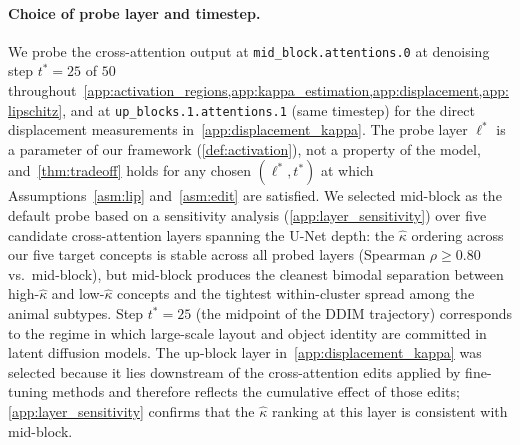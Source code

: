 \paragraph{Choice of probe layer and timestep.}
We probe the cross-attention output at \texttt{mid\_block.attentions.0} at denoising step $t^*=25$ of $50$ throughout~\cref{app:activation_regions,app:kappa_estimation,app:displacement,app:lipschitz}, and at \texttt{up\_blocks.1.attentions.1} (same timestep) for the direct displacement measurements in~\cref{app:displacement_kappa}. The probe layer $\ell^*$ is a parameter of our framework (\cref{def:activation}), not a property of the model, and~\cref{thm:tradeoff} holds for any chosen $(\ell^*, t^*)$ at which Assumptions~\ref{asm:lip} and~\ref{asm:edit} are satisfied. We selected mid-block as the default probe based on a sensitivity analysis (\cref{app:layer_sensitivity}) over five candidate cross-attention layers spanning the U-Net depth: the $\hat\kappa$ ordering across our five target concepts is stable across all probed layers (Spearman $\rho \geq 0.80$ vs.\ mid-block), but mid-block produces the cleanest bimodal separation between high-$\hat\kappa$ and low-$\hat\kappa$ concepts and the tightest within-cluster spread among the animal subtypes. Step $t^*=25$ (the midpoint of the DDIM trajectory) corresponds to the regime in which large-scale layout and object identity are committed in latent diffusion models. The up-block layer in~\cref{app:displacement_kappa} was selected because it lies downstream of the cross-attention edits applied by fine-tuning methods and therefore reflects the cumulative effect of those edits; \cref{app:layer_sensitivity} confirms that the $\hat\kappa$ ranking at this layer is consistent with mid-block.